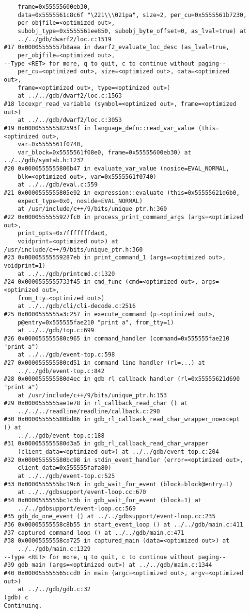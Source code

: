 \documentclass{report}
\begin{document}
\begin{verbatim}
    frame=0x55555600eb30, 
    data=0x5555561c8c6f "\221\\\021pa", size=2, per_cu=0x5555561b7230, 
    per_objfile=<optimized out>, 
    subobj_type=0x5555561ee850, subobj_byte_offset=0, as_lval=true) at 
    ../../gdb/dwarf2/loc.c:1519
#17 0x00005555557b8aaa in dwarf2_evaluate_loc_desc (as_lval=true, 
    per_objfile=<optimized out>, 
--Type <RET> for more, q to quit, c to continue without paging--
    per_cu=<optimized out>, size=<optimized out>, data=<optimized out>, 
    frame=<optimized out>, type=<optimized out>)
    at ../../gdb/dwarf2/loc.c:1563
#18 locexpr_read_variable (symbol=<optimized out>, frame=<optimized out>) 
    at ../../gdb/dwarf2/loc.c:3053
#19 0x000055555582593f in language_defn::read_var_value (this=<optimized out>, 
    var=0x5555561f0740, 
    var_block=0x5555561f08e0, frame=0x55555600eb30) at ../../gdb/symtab.h:1232
#20 0x0000555555806b47 in evaluate_var_value (noside=EVAL_NORMAL, 
    blk=<optimized out>, var=0x5555561f0740)
    at ../../gdb/eval.c:559
#21 0x0000555555805e92 in expression::evaluate (this=0x55555621d6b0, 
    expect_type=0x0, noside=EVAL_NORMAL)
    at /usr/include/c++/9/bits/unique_ptr.h:360
#22 0x0000555555927fc0 in process_print_command_args (args=<optimized out>, 
    print_opts=0x7fffffffdac0, 
    voidprint=<optimized out>) at /usr/include/c++/9/bits/unique_ptr.h:360
#23 0x00005555559287eb in print_command_1 (args=<optimized out>, voidprint=1) 
    at ../../gdb/printcmd.c:1320
#24 0x0000555555733f45 in cmd_func (cmd=<optimized out>, args=<optimized out>,
    from_tty=<optimized out>)
    at ../../gdb/cli/cli-decode.c:2516
#25 0x0000555555a3c257 in execute_command (p=<optimized out>, 
    p@entry=0x555555fae210 "print a", from_tty=1)
    at ../../gdb/top.c:699
#26 0x000055555580c965 in command_handler (command=0x555555fae210 "print a") 
    at ../../gdb/event-top.c:598
#27 0x000055555580cd51 in command_line_handler (rl=...) at 
    ../../gdb/event-top.c:842
#28 0x000055555580d4ec in gdb_rl_callback_handler (rl=0x55555621d690 "print a")
    at /usr/include/c++/9/bits/unique_ptr.h:153
#29 0x0000555555ae1e78 in rl_callback_read_char () at 
    ../../../readline/readline/callback.c:290
#30 0x000055555580bd86 in gdb_rl_callback_read_char_wrapper_noexcept () at 
    ../../gdb/event-top.c:188
#31 0x000055555580d3a5 in gdb_rl_callback_read_char_wrapper 
    (client_data=<optimized out>) at ../../gdb/event-top.c:204
#32 0x000055555580bc98 in stdin_event_handler (error=<optimized out>, 
    client_data=0x555555fafa80)
    at ../../gdb/event-top.c:525
#33 0x0000555555bc19c6 in gdb_wait_for_event (block=block@entry=1) 
    at ../../gdbsupport/event-loop.cc:670
#34 0x0000555555bc1c3b in gdb_wait_for_event (block=1) at 
    ../../gdbsupport/event-loop.cc:569
#35 gdb_do_one_event () at ../../gdbsupport/event-loop.cc:235
#36 0x00005555558c8b55 in start_event_loop () at ../../gdb/main.c:411
#37 captured_command_loop () at ../../gdb/main.c:471
#38 0x00005555558ca725 in captured_main (data=<optimized out>) at 
    ../../gdb/main.c:1329
--Type <RET> for more, q to quit, c to continue without paging--
#39 gdb_main (args=<optimized out>) at ../../gdb/main.c:1344
#40 0x000055555565ccd0 in main (argc=<optimized out>, argv=<optimized out>) 
    at ../../gdb/gdb.c:32
(gdb) c
Continuing.


\end{verbatim}
\end{document}
